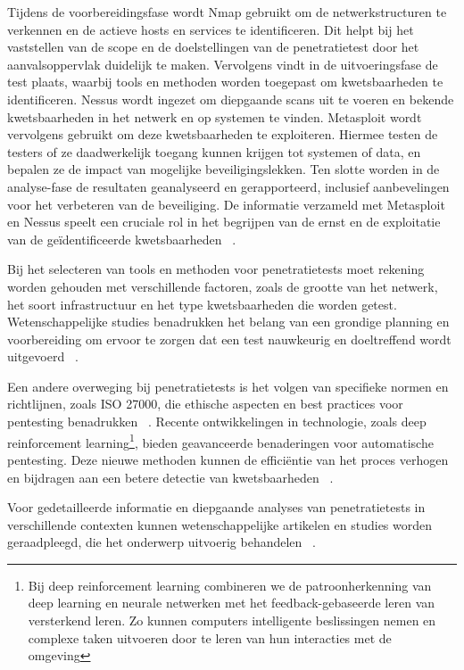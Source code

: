 Tijdens de voorbereidingsfase wordt Nmap gebruikt om de netwerkstructuren te verkennen en de actieve hosts en 
services te identificeren. Dit helpt bij het vaststellen van de scope en de doelstellingen van de penetratietest 
door het aanvalsoppervlak duidelijk te maken. Vervolgens vindt in de uitvoeringsfase de test plaats, waarbij tools en methoden worden 
toegepast om kwetsbaarheden te identificeren. Nessus wordt ingezet om diepgaande scans uit te voeren en 
bekende kwetsbaarheden in het netwerk en op systemen te vinden. Metasploit wordt vervolgens gebruikt om deze 
kwetsbaarheden te exploiteren. Hiermee testen de testers of ze daadwerkelijk toegang kunnen krijgen tot 
systemen of data, en bepalen ze de impact van mogelijke beveiligingslekken. Ten slotte worden in de analyse-fase de resultaten 
geanalyseerd en gerapporteerd, inclusief aanbevelingen voor het verbeteren van de beveiliging. De 
informatie verzameld met Metasploit en Nessus speelt een cruciale rol in het begrijpen van de ernst en de 
exploitatie van de geïdentificeerde kwetsbaarheden ~\autocite{Sarker2023}.

Bij het selecteren van tools en methoden voor penetratietests moet rekening worden gehouden met verschillende factoren, zoals de 
grootte van het netwerk, het soort infrastructuur en het type kwetsbaarheden die worden getest. Wetenschappelijke studies 
benadrukken het belang van een grondige planning en voorbereiding om ervoor te zorgen dat een test nauwkeurig en doeltreffend 
wordt uitgevoerd ~\autocite{Alhamed2023}.

Een andere overweging bij penetratietests is het volgen van specifieke normen en richtlijnen, zoals ISO 27000, die ethische 
aspecten en best practices voor pentesting benadrukken ~\autocite{DalalanaBertoglio2017}. Recente ontwikkelingen in technologie, zoals deep 
reinforcement learning\footnote{Bij deep reinforcement learning combineren we de patroonherkenning van deep learning en neurale 
netwerken met het feedback-gebaseerde leren van versterkend leren. Zo kunnen computers intelligente beslissingen nemen en complexe 
taken uitvoeren door te leren van hun interacties met de omgeving}, bieden geavanceerde benaderingen voor automatische pentesting. 
Deze nieuwe methoden kunnen de efficiëntie van het proces verhogen en bijdragen aan een betere detectie van kwetsbaarheden 
~\autocite{Yi2023}.

Voor gedetailleerde informatie en diepgaande analyses van penetratietests in verschillende contexten kunnen wetenschappelijke 
artikelen en studies worden geraadpleegd, die het onderwerp uitvoerig behandelen ~\autocite{Sarker2023}.

